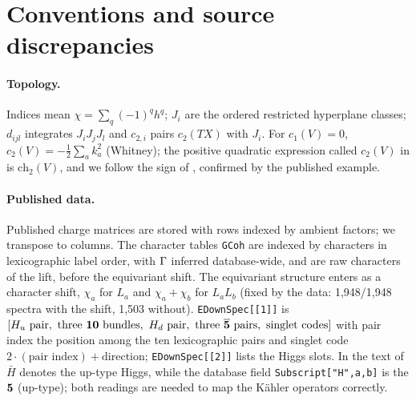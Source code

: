 \section{Conventions and source discrepancies}
\label{app:conventions}

\paragraph{Topology.} Indices mean $\chi=\sum_q(-1)^qh^q$; $J_i$ are the ordered
restricted hyperplane classes; $d_{ijl}$ integrates $J_iJ_jJ_l$ and $c_{2,i}$
pairs $c_2(TX)$ with $J_i$. For $c_1(V)=0$, $c_2(V)=-\tfrac12\sum_ak_a^2$ (Whitney);
the positive quadratic expression called $c_2(V)$ in \cite[Sec.~5]{ACGLP2013}
is $\mathrm{ch}_2(V)$, and we follow the sign of \cite[(2.3)]{BCL2013}, confirmed by
the published example.

\paragraph{Published data.} Published charge matrices are stored with rows
indexed by ambient factors; we transpose to columns. The character tables
\texttt{GCoh} are indexed by characters in lexicographic label order, with
$\Gamma$ inferred database-wide, and are raw characters of the lift, before the
equivariant shift. The equivariant structure enters as a character
shift, $\chi_a$ for $L_a$ and $\chi_a+\chi_b$ for $L_aL_b$ (fixed by the data:
1,948/1,948 spectra with the shift, 1,503 without).
\texttt{EDownSpec[[1]]} is
$[H_u\text{ pair},\ \text{three }\mathbf{10}\text{ bundles},\ H_d\text{ pair},\ \text{three
}\overline{\mathbf{5}}\text{ pairs},\ \text{singlet codes}]$ with pair index the position among
the ten lexicographic pairs and singlet code $2\cdot(\text{pair index})+\text{direction}$;
\texttt{EDownSpec[[2]]} lists the Higgs slots. In the text of \cite{AGLP2012}
$\bar H$ denotes the up-type Higgs, while the database field
\texttt{Subscript["H",a,b]} is the $\mathbf{5}$ (up-type); both readings are needed to
map the Kähler operators correctly.

